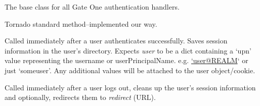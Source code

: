 \documentclass[letterpaper,10pt,openany]{sphinxmanual}
\begin{document}
\begin{fulllineitems}
\label{Developer/authentication:gateone.auth.authentication.BaseAuthHandler}
The base class for all Gate One authentication handlers.

\begin{fulllineitems}
\label{Developer/authentication:gateone.auth.authentication.BaseAuthHandler.get_current_user}
Tornado standard method--implemented our way.

\end{fulllineitems}


\begin{fulllineitems}
\label{Developer/authentication:gateone.auth.authentication.BaseAuthHandler.user_login}
Called immediately after a user authenticates successfully.  Saves
session information in the user's directory.  Expects \emph{user} to be a
dict containing a `upn' value representing the username or
userPrincipalName. e.g. \href{mailto:'user@REALM}{`user@REALM}` or just `someuser'.  Any additional
values will be attached to the user object/cookie.

\end{fulllineitems}


\begin{fulllineitems}
\label{Developer/authentication:gateone.auth.authentication.BaseAuthHandler.user_logout}
Called immediately after a user logs out, cleans up the user's session
information and optionally, redirects them to \emph{redirect} (URL).

\end{fulllineitems}


\end{fulllineitems}

\end{document}
